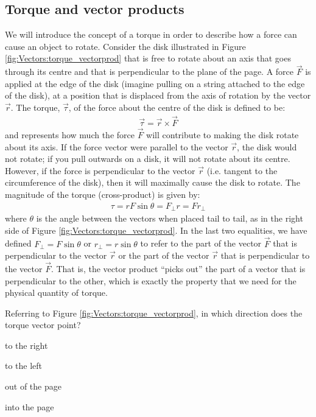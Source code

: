 \subsection{Torque and vector products}
We will introduce the concept of a torque in order to describe how a force can cause an object to rotate. Consider the disk illustrated in Figure \ref{fig:Vectors:torque_vectorprod} that is free to rotate about an axis that goes through its centre and that is perpendicular to the plane of the page. A force $\vec F$ is applied at the edge of the disk (imagine pulling on a string attached to the edge of the disk), at a position that is displaced from the axis of rotation by the vector $\vec r$. The torque, $\vec \tau$, of the force about the centre of the disk is defined to be:
\begin{align*}
\vec\tau=\vec r\times \vec F
\end{align*}
and represents how much the force $\vec F$ will contribute to making the disk rotate about its axis. If the force vector were parallel to the vector $\vec r$, the disk would not rotate; if you pull outwards on a disk, it will not rotate about its centre. However, if the force is perpendicular to the vector $\vec r$ (i.e. tangent to the circumference of the disk), then it will maximally cause the disk to rotate. The magnitude of the torque (cross-product) is given by:
\begin{align*}
\tau =rF\sin\theta=F_{\perp}r=Fr_\perp
\end{align*}
where $\theta$ is the angle between the vectors when placed tail to tail, as in the right side of Figure \ref{fig:Vectors:torque_vectorprod}. In the last two equalities, we have defined $F_\perp=F\sin\theta$ or $r_\perp=r\sin\theta$ to refer to the part of the vector $\vec F$ that is perpendicular to the vector $\vec r$ or the part of the vector $\vec r$ that is perpendicular to the vector $\vec F$. That is, the vector product ``picks out'' the part of a vector that is perpendicular to the other, which is exactly the property that we need for the physical quantity of torque.


\begin{checkpoint}
\begin{MCquestion}{Referring to Figure \ref{fig:Vectors:torque_vectorprod}, in which direction does the torque vector point?}
\item to the right
\item to the left
\item out of the page 
\item into the page \correct
\end{MCquestion}
\end{checkpoint}

